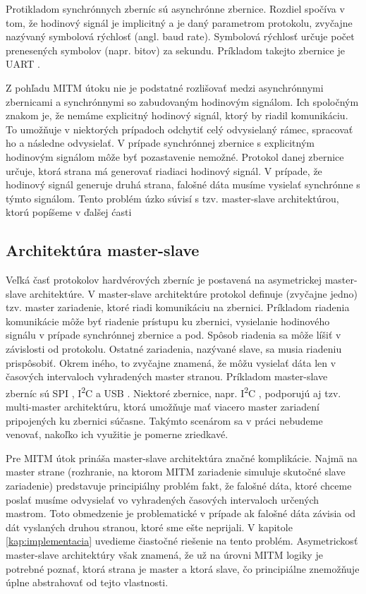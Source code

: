 Protikladom synchrónnych zberníc sú asynchrónne zbernice. Rozdiel spočíva v tom, že hodinový signál je implicitný a je daný parametrom protokolu, zvyčajne nazývaný symbolová rýchlosť (angl. baud rate). Symbolová rýchlosť určuje počet prenesených symbolov (napr. bitov) za sekundu. Príkladom takejto zbernice je UART \cite{uartBus}.

Z pohľadu MITM útoku nie je podstatné rozlišovať medzi asynchrónnymi zbernicami a synchrónnymi so zabudovaným hodinovým signálom. Ich spoločným znakom je, že nemáme explicitný hodinový signál, ktorý by riadil komunikáciu. To umožňuje v niektorých prípadoch odchytiť celý odvysielaný rámec, spracovať ho a následne odvysielať. V prípade synchrónnej zbernice s explicitným hodinovým signálom môže byť pozastavenie nemožné. Protokol danej zbernice určuje, ktorá strana má generovať riadiaci hodinový signál. V prípade, že hodinový signál generuje druhá strana, falošné dáta musíme vysielať synchrónne s týmto signálom. Tento problém úzko súvisí s tzv. master-slave architektúrou, ktorú popíšeme v ďalšej ćasti

\subsection{Architektúra master-slave}
Veľká časť protokolov hardvérových zberníc je postavená na asymetrickej master-slave architektúre. V master-slave architektúre protokol definuje (zvyčajne jedno) tzv. master zariadenie, ktoré riadi komunikáciu na zbernici. Príkladom riadenia komunikácie môže byť riadenie prístupu ku zbernici, vysielanie hodinového signálu v prípade synchrónnej zbernice a pod. Spôsob riadenia sa môže líšiť v závislosti od protokolu. Ostatné zariadenia, nazývané slave, sa musia riadeniu prispôsobiť. Okrem iného, to zvyčajne znamená, že môžu vysielať dáta len v časových intervaloch vyhradených master stranou. Príkladom master-slave zberníc sú SPI \cite{spiBus}, I\textsuperscript{2}C \cite{i2cSpec} a USB \cite{usbSpec}. Niektoré zbernice, napr. I\textsuperscript{2}C \cite{i2cSpec}, podporujú aj tzv. multi-master architektúru, ktorá umožňuje mať viacero master zariadení pripojených ku zbernici súčasne. Takýmto scenárom sa v práci nebudeme venovať, nakoľko ich využitie je pomerne zriedkavé.

Pre MITM útok prináša master-slave architektúra značné komplikácie. Najmä na master strane (rozhranie, na ktorom MITM zariadenie simuluje skutočné slave zariadenie) predstavuje principiálny problém fakt, že falošné dáta, ktoré chceme poslať musíme odvysielať vo vyhradených časových intervaloch určených mastrom. Toto obmedzenie je problematické v prípade ak falošné dáta závisia od dát vyslaných druhou stranou, ktoré sme ešte neprijali. V kapitole \ref{kap:implementacia} uvedieme čiastočné riešenie na tento problém. Asymetrickosť master-slave architektúry však znamená, že už na úrovni MITM logiky je potrebné poznať, ktorá strana je master a ktorá slave, čo principiálne znemožňuje úplne abstrahovať od tejto vlastnosti.


